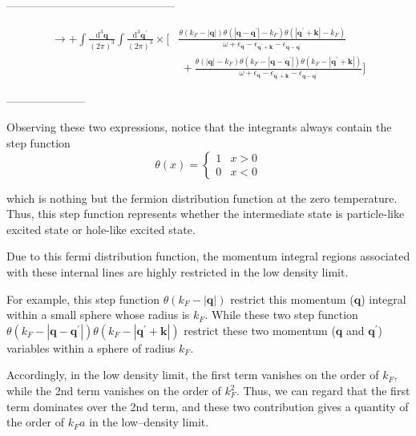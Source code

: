 \begin{center}---------------------------------------------\end{center}
\begin{equation} \label{Eqs2.7.2} \begin{split}
\rightarrow + \int \frac{\mathrm{d}^3 \mathbf{q}}{(2\pi)^3}\int \frac{\mathrm{d}^3 \mathbf{q}^{'}}{(2\pi)^3} \times [ &\frac{\theta(k_F-|\mathbf{q}|)\theta(|\mathbf{q}-\mathbf{q}^{'}|-k_F)\theta(|\mathbf{q}^{'}+\mathbf{k}|-k_F)}{\omega+\epsilon_{\mathbf{q}} - \epsilon_{\mathbf{q}^{'}+\mathbf{k}}-\epsilon_{\mathbf{q}-\mathbf{q}^{'}}} \\
& \ + \frac{\theta(|\mathbf{q}|-k_F)\theta(k_F-|\mathbf{q}-\mathbf{q}^{'}|)\theta(k_F-|\mathbf{q}^{'}+\mathbf{k}|)}{\omega+\epsilon_{\mathbf{q}} - \epsilon_{\mathbf{q}^{'}+\mathbf{k}}-\epsilon_{\mathbf{q}-\mathbf{q}^{'}}} ]
\end{split} \end{equation}

\begin{center}---------------------\end{center}

Observing these two expressions, notice that the integrants always contain the step function
\[ \theta(x) = \begin{cases} 1 & x > 0\\ 0 & x < 0 \end{cases} \]

which is nothing but the fermion distribution function at the zero temperature. Thus, this step function represents whether the intermediate state is particle-like excited state or hole-like excited state.

Due to this fermi distribution function, the momentum integral regions associated with these internal lines are highly restricted in the low density limit.

For example, this step function $\theta(k_F - |\mathbf{q}|)$ restrict this momentum ($\mathbf{q}$) integral within a small sphere whose radius is $k_F$. While these two step function $\theta(k_F-|\mathbf{q}-\mathbf{q}^{'}|)\theta(k_F-|\mathbf{q}^{'}+\mathbf{k}|)$ restrict these two momentum ($\mathbf{q}$ and $\mathbf{q}^{'}$) variables within a sphere of radius $k_F$.%

Accordingly, in the low density limit, the first term vanishes on the order of $k_F$, while the 2nd term vanishes on the order of $k_F^2$. Thus, we can regard that the first term dominates over the 2nd term, and these two contribution gives a quantity of the order of $k_F a$ in the low--density limit.

